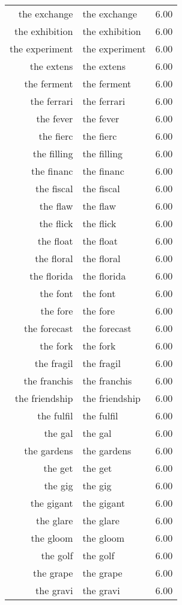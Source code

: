\begin{table}[ht]
\begin{tabular}{rlr}
  the exchange & the exchange & 6.00 \\ 
  the exhibition & the exhibition & 6.00 \\ 
  the experiment & the experiment & 6.00 \\ 
  the extens & the extens & 6.00 \\ 
  the ferment & the ferment & 6.00 \\ 
  the ferrari & the ferrari & 6.00 \\ 
  the fever & the fever & 6.00 \\ 
  the fierc & the fierc & 6.00 \\ 
  the filling & the filling & 6.00 \\ 
  the financ & the financ & 6.00 \\ 
  the fiscal & the fiscal & 6.00 \\ 
  the flaw & the flaw & 6.00 \\ 
  the flick & the flick & 6.00 \\ 
  the float & the float & 6.00 \\ 
  the floral & the floral & 6.00 \\ 
  the florida & the florida & 6.00 \\ 
  the font & the font & 6.00 \\ 
  the fore & the fore & 6.00 \\ 
  the forecast & the forecast & 6.00 \\ 
  the fork & the fork & 6.00 \\ 
  the fragil & the fragil & 6.00 \\ 
  the franchis & the franchis & 6.00 \\ 
  the friendship & the friendship & 6.00 \\ 
  the fulfil & the fulfil & 6.00 \\ 
  the gal & the gal & 6.00 \\ 
  the gardens & the gardens & 6.00 \\ 
  the get & the get & 6.00 \\ 
  the gig & the gig & 6.00 \\ 
  the gigant & the gigant & 6.00 \\ 
  the glare & the glare & 6.00 \\ 
  the gloom & the gloom & 6.00 \\ 
  the golf & the golf & 6.00 \\ 
  the grape & the grape & 6.00 \\ 
  the gravi & the gravi & 6.00 \\ 

\end{tabular}
\end{table}
